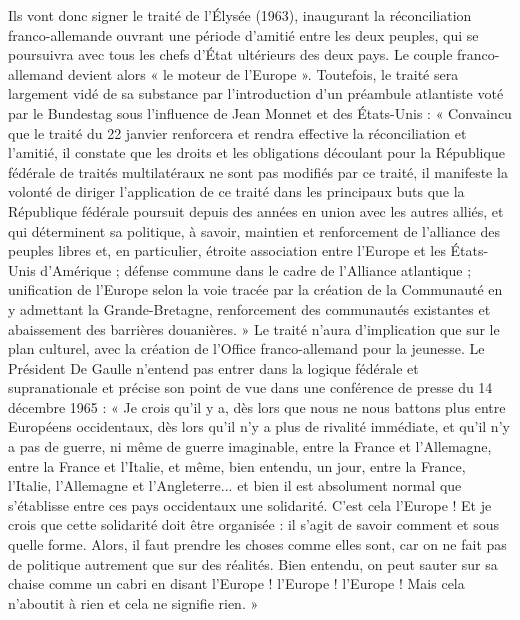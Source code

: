 \documentclass{report}%
\begin{document}
Ils vont donc signer le traité de l'Élysée (1963), inaugurant la réconciliation franco-allemande ouvrant une période d'amitié entre les deux peuples, qui se poursuivra avec tous les chefs d'État ultérieurs des deux pays. Le couple franco-allemand devient alors « le moteur de l'Europe ». Toutefois, le traité sera largement vidé de sa substance par l'introduction d'un préambule atlantiste voté par le Bundestag sous l'influence de Jean Monnet et des États-Unis :
« Convaincu que le traité du 22 janvier renforcera et rendra effective la réconciliation et l’amitié, il constate que les droits et les obligations découlant pour la République fédérale de traités multilatéraux ne sont pas modifiés par ce traité, il manifeste la volonté de diriger l’application de ce traité dans les principaux buts que la République fédérale poursuit depuis des années en union avec les autres alliés, et qui déterminent sa politique, à savoir, maintien et renforcement de l’alliance des peuples libres et, en particulier, étroite association entre l’Europe et les États-Unis d’Amérique ; défense commune dans le cadre de l’Alliance atlantique ; unification de l’Europe selon la voie tracée par la création de la Communauté en y admettant la Grande-Bretagne, renforcement des communautés existantes et abaissement des barrières douanières. »
Le traité n'aura d'implication que sur le plan culturel, avec la création de l'Office franco-allemand pour la jeunesse.
Le Président De Gaulle n'entend pas entrer dans la logique fédérale et supranationale et précise son point de vue dans une conférence de presse du 14 décembre 1965 :
« Je crois qu’il y a, dès lors que nous ne nous battons plus entre Européens occidentaux, dès lors qu’il n’y a plus de rivalité immédiate, et qu’il n’y a pas de guerre, ni même de guerre imaginable, entre la France et l’Allemagne, entre la France et l’Italie, et même, bien entendu, un jour, entre la France, l’Italie, l’Allemagne et l’Angleterre... et bien il est absolument normal que s’établisse entre ces pays occidentaux une solidarité. C’est cela l’Europe ! Et je crois que cette solidarité doit être organisée : il s’agit de savoir comment et sous quelle forme. Alors, il faut prendre les choses comme elles sont, car on ne fait pas de politique autrement que sur des réalités. Bien entendu, on peut sauter sur sa chaise comme un cabri en disant l’Europe ! l’Europe ! l’Europe ! Mais cela n’aboutit à rien et cela ne signifie rien. »
\end{document}

